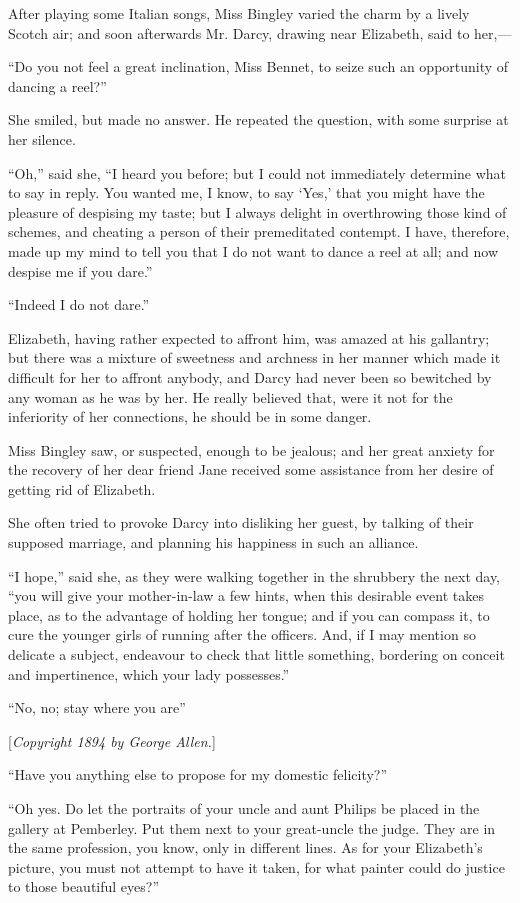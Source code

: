 \documentclass[12pt,openright]{book}
\begin{document}
After playing some Italian songs, Miss Bingley varied the charm by a lively Scotch air; and soon afterwards Mr. Darcy, drawing near Elizabeth, said to her,—

“Do you not feel a great inclination, Miss Bennet, to seize such an opportunity of dancing a reel?”

She smiled, but made no answer. He repeated the question, with some surprise at her silence.

“Oh,” said she, “I heard you before; but I could not immediately determine what to say in reply. You wanted me, I know, to say ‘Yes,’ that you might have the pleasure of despising my taste; but I always delight in overthrowing those kind of schemes, and cheating a person of their premeditated contempt. I have, therefore, made up my mind to tell you that I do not want to dance a reel at all; and now despise me if you dare.”

“Indeed I do not dare.”

Elizabeth, having rather expected to affront him, was amazed at his gallantry; but there was a mixture of sweetness and archness in her manner which made it difficult for her to affront anybody, and Darcy had never been so bewitched by any woman as he was by her. He really believed that, were it not for the inferiority of her connections, he should be in some danger.

Miss Bingley saw, or suspected, enough to be jealous; and her great anxiety for the recovery of her dear friend Jane received some assistance from her desire of getting rid of Elizabeth.

She often tried to provoke Darcy into disliking her guest, by talking of their supposed marriage, and planning his happiness in such an alliance.

“I hope,” said she, as they were walking together in the shrubbery the next day, “you will give your mother-in-law a few hints, when this desirable event takes place, as to the advantage of holding her tongue; and if you can compass it, to cure the younger girls of running after the officers. And, if I may mention so delicate a subject, endeavour to check that little something, bordering on conceit and impertinence, which your lady possesses.”

“No, no; stay where you are”

[\textit{Copyright 1894 by George Allen.}]

“Have you anything else to propose for my domestic felicity?”

“Oh yes. Do let the portraits of your uncle and aunt Philips be placed in the gallery at Pemberley. Put them next to your great-uncle the judge. They are in the same profession, you know, only in different lines. As for your Elizabeth’s picture, you must not attempt to have it taken, for what painter could do justice to those beautiful eyes?”
\end{document}
